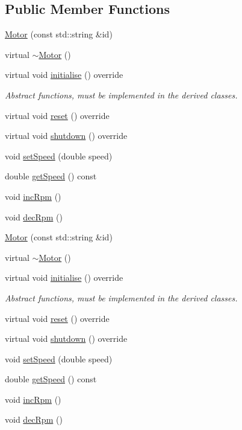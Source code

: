 \subsection*{Public Member Functions}
\begin{DoxyCompactItemize}
\item 
\hyperlink{class_motor_aade6af850e0177846336ddd136b1f2c9}{Motor} (const std\+::string \&id)
\item 
virtual \hyperlink{class_motor_a3135cf1bc9a3c68e1db0214c00a2b50f}{$\sim$\+Motor} ()
\item 
virtual void \hyperlink{class_motor_a7b47a09309764fdaeb8d6e6b2cac5c07}{initialise} () override
\begin{DoxyCompactList}\small\item\em Abstract functions, must be implemented in the derived classes. \end{DoxyCompactList}\item 
virtual void \hyperlink{class_motor_a0d0d43531b4b8b9d37fb8f936dd0f53c}{reset} () override
\item 
virtual void \hyperlink{class_motor_a8ef8df58afeba551f02b8e4afbd23c50}{shutdown} () override
\item 
void \hyperlink{class_motor_a4aece812dc94b008a874e4b38c3a3863}{set\+Speed} (double speed)
\item 
double \hyperlink{class_motor_aa6ed19d9c4f2deb0bb38460e3572bdc4}{get\+Speed} () const 
\item 
void \hyperlink{class_motor_a93a4de89dd6f493c165137a78e3d97b4}{inc\+Rpm} ()
\item 
void \hyperlink{class_motor_ac271f30175d294a9d27d50193840d61e}{dec\+Rpm} ()
\item 
\hyperlink{class_motor_aade6af850e0177846336ddd136b1f2c9}{Motor} (const std\+::string \&id)
\item 
virtual \hyperlink{class_motor_a3135cf1bc9a3c68e1db0214c00a2b50f}{$\sim$\+Motor} ()
\item 
virtual void \hyperlink{class_motor_af499f6ed70a5f8a7f57b08c08b0c381f}{initialise} () override
\begin{DoxyCompactList}\small\item\em Abstract functions, must be implemented in the derived classes. \end{DoxyCompactList}\item 
virtual void \hyperlink{class_motor_a8118086ae56a38eca05df9a149bf22a6}{reset} () override
\item 
virtual void \hyperlink{class_motor_a2fb3663647ed56cc9061ab1a914df95a}{shutdown} () override
\item 
void \hyperlink{class_motor_a4aece812dc94b008a874e4b38c3a3863}{set\+Speed} (double speed)
\item 
double \hyperlink{class_motor_aa6ed19d9c4f2deb0bb38460e3572bdc4}{get\+Speed} () const 
\item 
void \hyperlink{class_motor_a93a4de89dd6f493c165137a78e3d97b4}{inc\+Rpm} ()
\item 
void \hyperlink{class_motor_ac271f30175d294a9d27d50193840d61e}{dec\+Rpm} ()
\end{DoxyCompactItemize}


